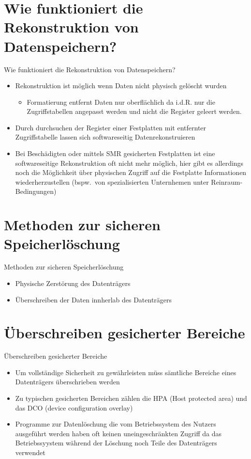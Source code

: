 \documentclass{beamer}
\begin{document}
\section{Wie funktioniert die Rekonstruktion von Datenspeichern?}
\begin{frame}{Wie funktioniert die Rekonstruktion von Datenspeichern?}
	\begin{itemize}
		\item Rekonstruktion ist möglich wenn Daten nicht physisch gelöscht
			wurden
			\begin{itemize}
				\item Formatierung entfernt Daten nur oberflächlich da i.d.R.
					nur die Zugriffstabellen angepasst werden und nicht die
					Register geleert werden.
			\end{itemize}
		\item Durch durchsuchen der Register einer Festplatten mit entfernter
			Zugriffstabelle lassen sich softwareseitig Datenrekonstruieren
		\item Bei Beschädigten oder mittels SMR gesicherten Festplatten ist
			eine softwareseitige Rekonstruktion oft nicht mehr möglich, hier
			gibt es allerdings noch die Möglichkeit über physischen Zugriff auf
			die Festplatte Informationen wiederherzustellen (bspw.\ von
			spezialisierten Unternhemen unter Reinraum-Bedingungen)
	\end{itemize}
\end{frame}

\section{Methoden zur sicheren Speicherlöschung}
\begin{frame}{Methoden zur sicheren Speicherlöschung}
	\begin{itemize}
		\item Physische Zerstörung des Datenträgers
		\item Überschreiben der Daten innherlab des Datenträgers
	\end{itemize}
\end{frame}

\section{Überschreiben gesicherter Bereiche}
\begin{frame}{Überschreiben gesicherter Bereiche}
	\begin{itemize}
		\item Um vollständige Sicherheit zu gewährleisten müss sämtliche
			Bereiche eines Datenträgers überschrieben werden
		\item Zu typischen gesicherten Bereichen zählen die HPA (Host protected
			area) und das DCO (device configuration overlay)
		\item Programme zur Datenlöschung die vom Betriebssystem des Nutzers
			ausgeführt werden haben oft keinen uneingeschränkten Zugriff da das
			Betriebssyystem während der Löschung noch Teile des Datenträgers
			verwendet
	\end{itemize}
\end{frame}
\end{document}
